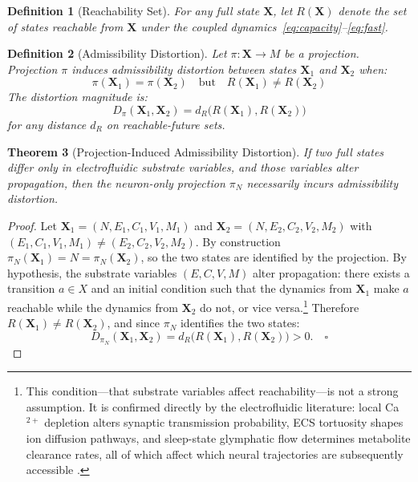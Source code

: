 \documentclass[12pt,a4paper]{article}
\newtheorem{theorem}{Theorem}[section]
\newtheorem{definition}[theorem]{Definition}
\begin{document}
\begin{definition}[Reachability Set]
For any full state $\mathbf{X}$, let $R(\mathbf{X})$ denote the set of states reachable from $\mathbf{X}$ under the coupled dynamics~\eqref{eq:capacity}--\eqref{eq:fast}.
\end{definition}

\begin{definition}[Admissibility Distortion]
Let $\pi: \mathbf{X} \to M$ be a projection. Projection $\pi$ induces admissibility distortion between states $\mathbf{X}_1$ and $\mathbf{X}_2$ when:
\[
\pi(\mathbf{X}_1) = \pi(\mathbf{X}_2) \quad \text{but} \quad R(\mathbf{X}_1) \neq R(\mathbf{X}_2)
\]
The distortion magnitude is:
\[
D_\pi(\mathbf{X}_1, \mathbf{X}_2) = d_R\bigl(R(\mathbf{X}_1), R(\mathbf{X}_2)\bigr)
\]
for any distance $d_R$ on reachable-future sets.
\end{definition}

\begin{theorem}[Projection-Induced Admissibility Distortion]
\label{thm:clio}
If two full states differ only in electrofluidic substrate variables, and those variables alter propagation, then the neuron-only projection $\pi_N$ necessarily incurs admissibility distortion.
\end{theorem}

\begin{proof}
Let $\mathbf{X}_1 = (N, E_1, C_1, V_1, M_1)$ and $\mathbf{X}_2 = (N, E_2, C_2, V_2, M_2)$ with $(E_1,C_1,V_1,M_1) \neq (E_2,C_2,V_2,M_2)$. By construction $\pi_N(\mathbf{X}_1) = N = \pi_N(\mathbf{X}_2)$, so the two states are identified by the projection. By hypothesis, the substrate variables $(E,C,V,M)$ alter propagation: there exists a transition $a \in X$ and an initial condition such that the dynamics from $\mathbf{X}_1$ make $a$ reachable while the dynamics from $\mathbf{X}_2$ do not, or vice versa.\footnote{This condition---that substrate variables affect reachability---is not a strong assumption. It is confirmed directly by the electrofluidic literature: local Ca$^{2+}$ depletion alters synaptic transmission probability, ECS tortuosity shapes ion diffusion pathways, and sleep-state glymphatic flow determines metabolite clearance rates, all of which affect which neural trajectories are subsequently accessible \cite{chakravarthy2026}.} Therefore $R(\mathbf{X}_1) \neq R(\mathbf{X}_2)$, and since $\pi_N$ identifies the two states:
\[
D_{\pi_N}(\mathbf{X}_1, \mathbf{X}_2) = d_R\bigl(R(\mathbf{X}_1), R(\mathbf{X}_2)\bigr) > 0. \quad\square
\]
\end{proof}
\end{document}
